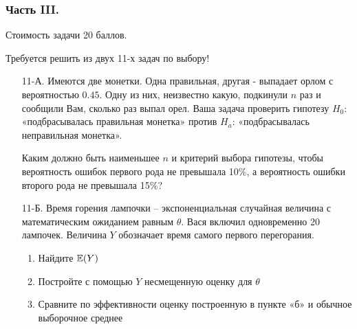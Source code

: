 \subsubsection*{Часть III.}

Стоимость задачи 20 баллов.

Требуется решить \textbf{} из двух 11-х задач по
выбору!

\begin{enumerate}
\item[11-А.] Имеются две монетки. Одна правильная, другая - выпадает орлом с
вероятностью $0.45$. Одну из них, неизвестно какую, подкинули $n$
раз и сообщили Вам, сколько раз выпал орел. Ваша задача проверить
гипотезу $H_{0}$: «подбрасывалась правильная монетка» против
$H_{a}$:
«подбрасывалась неправильная монетка».

Каким должно быть наименьшее $n$ и критерий выбора гипотезы, чтобы
вероятность ошибок первого рода не превышала 10\%, а вероятность
ошибки второго рода не превышала 15\%?

\item[11-Б.] Время горения лампочки – экспоненциальная случайная величина с
математическим ожиданием равным $\theta $. Вася включил
одновременно 20 лампочек. Величина  $Y$ обозначает время самого
первого перегорания.
\begin{enumerate}
\item Найдите $\mathbb{E}(Y)$
\item Постройте с помощью  $Y$ несмещенную оценку для  $\theta$
\item Сравните по эффективности оценку построенную в пункте
«б» и
обычное выборочное среднее
\end{enumerate}
\end{enumerate}
